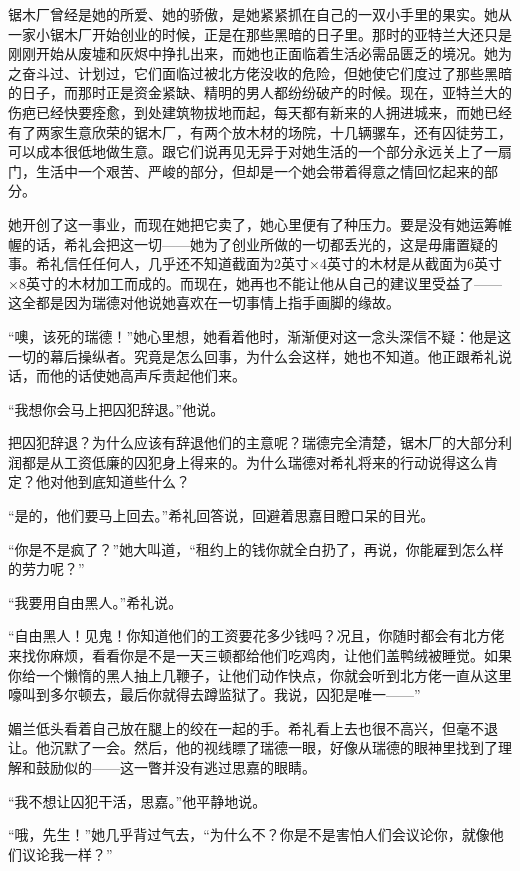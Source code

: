 \par 锯木厂曾经是她的所爱、她的骄傲，是她紧紧抓在自己的一双小手里的果实。她从一家小锯木厂开始创业的时候，正是在那些黑暗的日子里。那时的亚特兰大还只是刚刚开始从废墟和灰烬中挣扎出来，而她也正面临着生活必需品匮乏的境况。她为之奋斗过、计划过，它们面临过被北方佬没收的危险，但她使它们度过了那些黑暗的日子，而那时正是资金紧缺、精明的男人都纷纷破产的时候。现在，亚特兰大的伤疤已经快要痊愈，到处建筑物拔地而起，每天都有新来的人拥进城来，而她已经有了两家生意欣荣的锯木厂，有两个放木材的场院，十几辆骡车，还有囚徒劳工，可以成本很低地做生意。跟它们说再见无异于对她生活的一个部分永远关上了一扇门，生活中一个艰苦、严峻的部分，但却是一个她会带着得意之情回忆起来的部分。
\par 她开创了这一事业，而现在她把它卖了，她心里便有了种压力。要是没有她运筹帷幄的话，希礼会把这一切——她为了创业所做的一切都丢光的，这是毋庸置疑的事。希礼信任任何人，几乎还不知道截面为2英寸×4英寸的木材是从截面为6英寸×8英寸的木材加工而成的。而现在，她再也不能让他从自己的建议里受益了——这全都是因为瑞德对他说她喜欢在一切事情上指手画脚的缘故。
\par “噢，该死的瑞德！”她心里想，她看着他时，渐渐便对这一念头深信不疑：他是这一切的幕后操纵者。究竟是怎么回事，为什么会这样，她也不知道。他正跟希礼说话，而他的话使她高声斥责起他们来。
\par “我想你会马上把囚犯辞退。”他说。
\par 把囚犯辞退？为什么应该有辞退他们的主意呢？瑞德完全清楚，锯木厂的大部分利润都是从工资低廉的囚犯身上得来的。为什么瑞德对希礼将来的行动说得这么肯定？他对他到底知道些什么？
\par “是的，他们要马上回去。”希礼回答说，回避着思嘉目瞪口呆的目光。
\par “你是不是疯了？”她大叫道，“租约上的钱你就全白扔了，再说，你能雇到怎么样的劳力呢？”
\par “我要用自由黑人。”希礼说。
\par “自由黑人！见鬼！你知道他们的工资要花多少钱吗？况且，你随时都会有北方佬来找你麻烦，看看你是不是一天三顿都给他们吃鸡肉，让他们盖鸭绒被睡觉。如果你给一个懒惰的黑人抽上几鞭子，让他们动作快点，你就会听到北方佬一直从这里嚎叫到多尔顿去，最后你就得去蹲监狱了。我说，囚犯是唯一——”
\par 媚兰低头看着自己放在腿上的绞在一起的手。希礼看上去也很不高兴，但毫不退让。他沉默了一会。然后，他的视线瞟了瑞德一眼，好像从瑞德的眼神里找到了理解和鼓励似的——这一瞥并没有逃过思嘉的眼睛。
\par “我不想让囚犯干活，思嘉。”他平静地说。
\par “哦，先生！”她几乎背过气去，“为什么不？你是不是害怕人们会议论你，就像他们议论我一样？”
